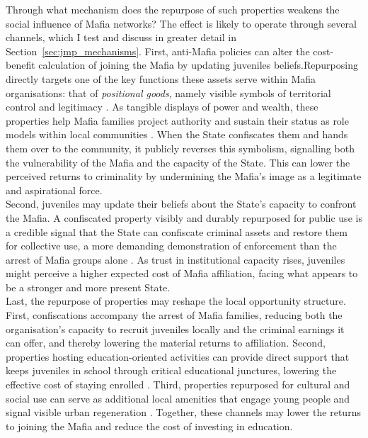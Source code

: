 \documentclass[12pt]{article}
\theoremstyle{plain}
\theoremstyle{plain}
\theoremstyle{plain}
\theoremstyle{definition}
\theoremstyle{plain}
\theoremstyle{definition}
\theoremstyle{plain}
\theoremstyle{remark}
\theoremstyle{definition}
\theoremstyle{definition}
\theoremstyle{plain}
\begin{document}
\medskip
 Through what mechanism does the repurpose of such properties weakens the social influence of Mafia networks? The effect is likely to operate through several channels, which I test and discuss in greater detail in Section~\ref{sec:jmp_mechanisms}.
First, anti-Mafia policies can alter the cost-benefit calculation of joining the Mafia by updating juveniles beliefs.Repurposing directly targets one of the key functions these assets serve within Mafia organisations: that of \emph{positional goods}, namely visible symbols of territorial control and legitimacy \citep{hirsch_social_1976, baldascino_gestione_2012}. As tangible displays of power and wealth, these properties help Mafia families project authority and sustain their status as role models within local communities \citep{mosca_social_2017}. When the State confiscates them and hands them over to the community, it publicly reverses this symbolism, signalling both the vulnerability of the Mafia and the capacity of the State. This can lower the perceived returns to criminality by undermining the Mafia's image as a legitimate and aspirational force. \\
Second, juveniles may update their beliefs about the State's capacity to confront the Mafia. A confiscated property visibly and durably repurposed for public use is a credible signal that the State can confiscate criminal assets and restore them for collective use, a more demanding demonstration of enforcement than the arrest of Mafia groups alone \citep{chiodo_community_2021, mosca_social_2017, heller_thinking_2017}. As trust in institutional capacity rises, juveniles might perceive a higher expected cost of Mafia affiliation, facing what appears to be a stronger and more present State.
 \\
Last, the repurpose of properties may reshape the local opportunity structure. First, confiscations accompany the arrest of Mafia families, reducing both the organisation's capacity to recruit juveniles locally and the criminal earnings it can offer, and thereby lowering the material returns to affiliation. Second, properties hosting education-oriented activities can provide direct support that keeps juveniles in school through critical educational junctures, lowering the effective cost of staying enrolled \citep{heller_summer_2014, garcia_early_2019}. Third, properties repurposed for cultural and social use can serve as additional local amenities that engage young people and signal visible urban regeneration \citep{datcher_effects_1982, ludwig_long-term_2013}. Together, these channels may lower the returns to joining the Mafia and reduce the cost of investing in education. \\
\end{document}

